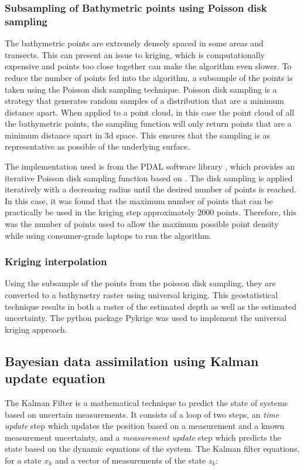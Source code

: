 \subsubsection{Subsampling of Bathymetric points using Poisson disk sampling}  \label{subsec:poissonsubsampling}
The bathymetric points are extremely densely spaced in some areas and transects. This can present an issue to kriging, which is computationally expensive and points too close together can make the algorithm even slower. To reduce the number of points fed into the algorithm, a subsample of the points is taken using the Poisson disk sampling technique. Poisson disk sampling is a strategy that generates random samples of a distribution that are a minimum distance apart. When applied to a point cloud, in this case the point cloud of all the bathymetric points, the sampling function will only return points that are a minimum distance apart in 3d space. This ensures that the sampling is as representative as possible of the underlying surface.

The implementation used is from the PDAL software library \parencite{howard_butler_2022_6369164}, which provides an iterative Poisson disk sampling function based on \citeauthor{McCool1992}. The disk sampling is applied iteratively with a decreasing radius until the desired number of points is reached. In this case, it was found that the maximum number of points that can be practically be used in the kriging step approximately 2000 points. Therefore, this was the number of points used to allow the maximum possible point density while using consumer-grade laptops to run the algorithm. 

\subsubsection{Kriging interpolation}
Using the subsample of the points from the poisson disk sampling, they are converted to a bathymetry raster using universal kriging. This geostatistical technique results in both a raster of the estimated depth as well as the estimated uncertainty. The python package Pykrige \parencite{benjamin_murphy_2021_5380342} was used to implement the universal kriging approach. 


\subsection{Bayesian data assimilation using Kalman update equation}
The Kalman Filter is a mathematical technique to predict the state of systems based on uncertain measurements. It consists of a loop of two steps, an \emph{time update} step which updates the position based on a measurement and a known measurement uncertainty, and a \emph{measurement update} step which predicts the state based on the dynamic equations of the system. The Kalman filter equations, for a state $x_k$ and a vector of measurements of the state $z_k$:

